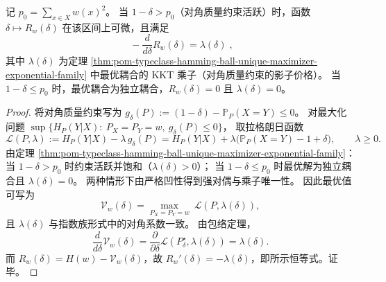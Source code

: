 \begin{theorem}\label{thm:pom-typeclass-dual-derivative}
记 \(p_0=\sum_{x\in X}w(x)^2\)。
当 \(1-\delta>p_0\)（对角质量约束活跃）时，函数 \(\delta\mapsto R_w(\delta)\) 在该区间上可微，且满足
\[
\boxed{\;
-\frac{d}{d\delta}R_w(\delta)=\lambda(\delta)\; } ,
\]
其中 \(\lambda(\delta)\) 为定理 \ref{thm:pom-typeclass-hamming-ball-unique-maximizer-exponential-family} 中最优耦合的 KKT 乘子（对角质量约束的影子价格）。
当 \(1-\delta\le p_0\) 时，最优耦合为独立耦合，\(R_w(\delta)=0\) 且 \(\lambda(\delta)=0\)。
\end{theorem}
\begin{proof}
将对角质量约束写为
\(
g_\delta(P):=(1-\delta)-\mathbb P_P(X=Y)\le 0
\)。
对最大化问题
\(
\sup\{H_P(Y|X):\ P_X=P_Y=w,\ g_\delta(P)\le 0\}
\)，
取拉格朗日函数
\[
\mathscr L(P,\lambda)
:=H_P(Y|X)-\lambda\,g_\delta(P)
=H_P(Y|X)+\lambda\bigl(\mathbb P_P(X=Y)-1+\delta\bigr),
\qquad \lambda\ge 0.
\]
由定理 \ref{thm:pom-typeclass-hamming-ball-unique-maximizer-exponential-family}：
当 \(1-\delta>p_0\) 时约束活跃并饱和（\(\lambda(\delta)>0\)）；
当 \(1-\delta\le p_0\) 时最优解为独立耦合且 \(\lambda(\delta)=0\)。
两种情形下由严格凹性得到强对偶与乘子唯一性。
因此最优值可写为
\[
\mathcal V_w(\delta)=\max_{P_X=P_Y=w}\ \mathscr L(P,\lambda(\delta)),
\]
且 \(\lambda(\delta)\) 与指数族形式中的对角系数一致。
由包络定理，
\[
\frac{d}{d\delta}\mathcal V_w(\delta)=\frac{\partial}{\partial\delta}\mathscr L(P^\star_\delta,\lambda(\delta))=\lambda(\delta).
\]
而 \(R_w(\delta)=H(w)-\mathcal V_w(\delta)\)，故 \(R_w'(\delta)=-\lambda(\delta)\)，即所示恒等式。证毕。
\end{proof}

\endinput

